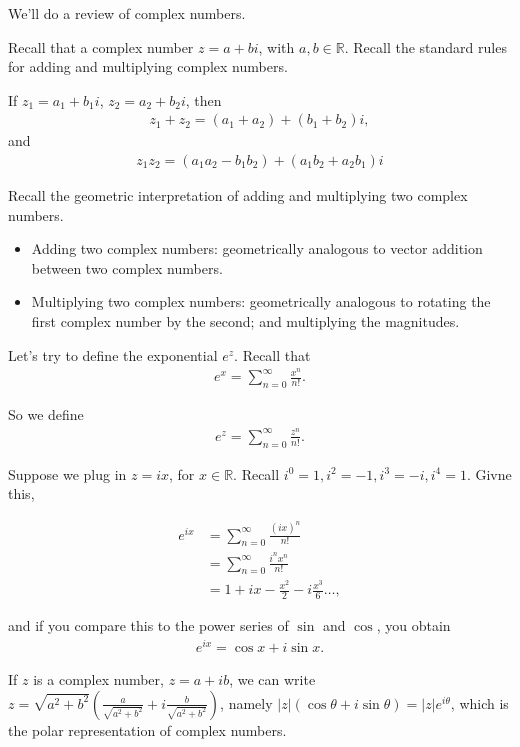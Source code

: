 \documentclass{article}
\begin{document}
We'll do a review of complex numbers.

Recall that a complex number $z = a+bi$, with $a, b \in \mathbb{R}$.  Recall the standard rules for adding and multiplying complex numbers.

If $z_1 = a_1 + b_1 i$, $z_2 = a_2 + b_2 i$, then
\begin{align*}
  z_1 + z_2 = (a_1 + a_2) + (b_1 + b_2)i,
\end{align*}
and
\begin{align*}
  z_1 z_2 = (a_1 a_2 - b_1 b_2) + (a_1 b_2 + a_2 b_1) i
\end{align*}

Recall the geometric interpretation of adding and multiplying two complex numbers.

\begin{itemize}
  \item Adding two complex numbers: geometrically analogous to vector addition between two complex numbers.
  \item Multiplying two complex numbers: geometrically analogous to rotating the first complex number by the second; and multiplying the magnitudes.
\end{itemize}

Let's try to define the exponential $e^z$.  Recall that
\begin{align*}
  e^x = \sum_{n=0}^{\infty} \frac{x^n}{n!}.
\end{align*}

So we define 
\begin{align*}
  e^z = \sum_{n=0}^{\infty} \frac{z^n}{n!}.
\end{align*}

Suppose we plug in $z  = ix$, for $x \in \mathbb{R}$.  Recall  $i^0 = 1, i^2 = -1, i^3 = -i, i^4 = 1$.  Givne this,

\begin{align*}
  e^{ix} &= \sum_{n=0}^{\infty} \frac{(ix)^n}{n!} \\
         &= \sum_{n=0}^{\infty} \frac{i^n x^n}{n!} \\
         &= 1 + ix - \frac{x^2}{2} - i \frac{x^3}{6} \ldots,
\end{align*}

and if you compare this to the power series of $\sin$ and $\cos$, you obtain
\begin{align*}
  e^{ix} = \cos x + i \sin x.
\end{align*}

If $z$ is a complex number, $z = a + ib$, we can write $z = \sqrt{a^2 + b^2} \left ( \frac{a}{\sqrt{a^2 + b^2}}  + i\frac{b}{\sqrt{a^2 + b^2}} \right )$, namely $|z| \left( \cos \theta + i \sin \theta \right) = |z| e^{i \theta}$, which is the polar representation of complex numbers.
\end{document}
